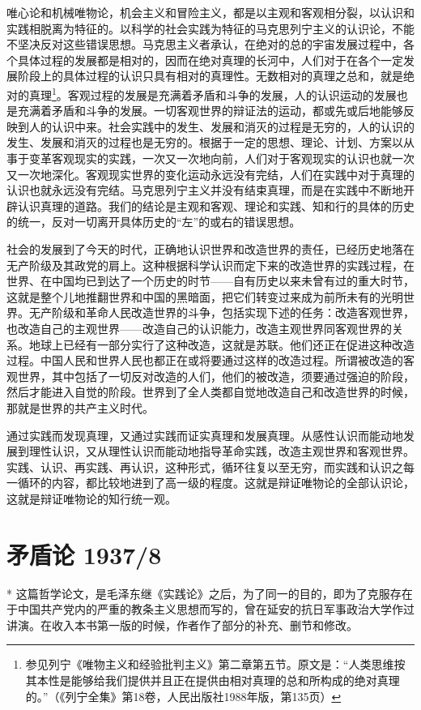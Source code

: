 \documentclass[UTF8, 12pt, a4paper]{ctexrep}
\begin{document}
唯心论和机械唯物论，机会主义和冒险主义，都是以主观和客观相分裂，以认识和实践相脱离为特征的。以科学的社会实践为特征的马克思列宁主义的认识论，不能不坚决反对这些错误思想。马克思主义者承认，在绝对的总的宇宙发展过程中，各个具体过程的发展都是相对的，因而在绝对真理的长河中，人们对于在各个一定发展阶段上的具体过程的认识只具有相对的真理性。无数相对的真理之总和，就是绝对的真理\footnote{参见列宁《唯物主义和经验批判主义》第二章第五节。原文是：“人类思维按其本性是能够给我们提供并且正在提供由相对真理的总和所构成的绝对真理的。”（《列宁全集》第18卷，人民出版社1988年版，第135页）}。客观过程的发展是充满着矛盾和斗争的发展，人的认识运动的发展也是充满着矛盾和斗争的发展。一切客观世界的辩证法的运动，都或先或后地能够反映到人的认识中来。社会实践中的发生、发展和消灭的过程是无穷的，人的认识的发生、发展和消灭的过程也是无穷的。根据于一定的思想、理论、计划、方案以从事于变革客观现实的实践，一次又一次地向前，人们对于客观现实的认识也就一次又一次地深化。客观现实世界的变化运动永远没有完结，人们在实践中对于真理的认识也就永远没有完结。马克思列宁主义并没有结束真理，而是在实践中不断地开辟认识真理的道路。我们的结论是主观和客观、理论和实践、知和行的具体的历史的统一，反对一切离开具体历史的“左”的或右的错误思想。

社会的发展到了今天的时代，正确地认识世界和改造世界的责任，已经历史地落在无产阶级及其政党的肩上。这种根据科学认识而定下来的改造世界的实践过程，在世界、在中国均已到达了一个历史的时节——自有历史以来未曾有过的重大时节，这就是整个儿地推翻世界和中国的黑暗面，把它们转变过来成为前所未有的光明世界。无产阶级和革命人民改造世界的斗争，包括实现下述的任务：改造客观世界，也改造自己的主观世界——改造自己的认识能力，改造主观世界同客观世界的关系。地球上已经有一部分实行了这种改造，这就是苏联。他们还正在促进这种改造过程。中国人民和世界人民也都正在或将要通过这样的改造过程。所谓被改造的客观世界，其中包括了一切反对改造的人们，他们的被改造，须要通过强迫的阶段，然后才能进入自觉的阶段。世界到了全人类都自觉地改造自己和改造世界的时候，那就是世界的共产主义时代。

通过实践而发现真理，又通过实践而证实真理和发展真理。从感性认识而能动地发展到理性认识，又从理性认识而能动地指导革命实践，改造主观世界和客观世界。实践、认识、再实践、再认识，这种形式，循环往复以至无穷，而实践和认识之每一循环的内容，都比较地进到了高一级的程度。这就是辩证唯物论的全部认识论，这就是辩证唯物论的知行统一观。

\section{矛盾论 1937/8}

* 这篇哲学论文，是毛泽东继《实践论》之后，为了同一的目的，即为了克服存在于中国共产党内的严重的教条主义思想而写的，曾在延安的抗日军事政治大学作过讲演。在收入本书第一版的时候，作者作了部分的补充、删节和修改。
\end{document}
